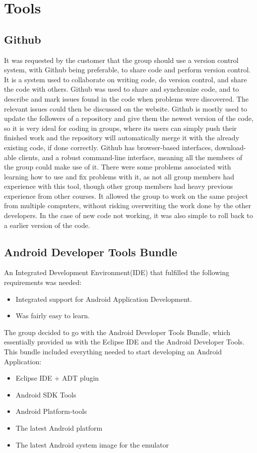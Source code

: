 \chapter{Tools}

\section{Github} 
\label{def:github}
\label{def:githubDev}
It was requested by the customer that the group should use a version control system, with Github being preferable, to share code and perform version control. It is a system used to collaborate on writing code, do version control, and share the code with others.  Github was used to share and synchronize code, and to describe and mark issues found in the code when problems were discovered. The relevant issues could then be discussed on the website.  Github is mostly used to update the followers of a repository and give them the newest version of the code, so it is  very ideal for coding in groups, where its users can simply push their finished work and the repository will automatically merge it with the already existing code, if done correctly.  Github has browser-based interfaces, download-able clients, and a robust command-line interface, meaning all the members of the group could make use of it. There were some problems associated with learning how to use and fix problems with it, as not all group members had experience with this tool, though other group members had heavy previous experience from other courses. It allowed the group to work on the same project from multiple computers, without risking overwriting the work done by the other developers. In the case of new code not working, it was also simple to roll back to a earlier version of the code. 

\section{Android Developer Tools Bundle}
An Integrated Development Environment(IDE) that fulfilled the following requirements was needed:
\begin{itemize}
\item Integrated support for Android Application Development.
\item Was fairly easy to learn. 
\end{itemize}
The group decided to go with the Android Developer Tools Bundle, which essentially provided us with the Eclipse IDE and the Android Developer Tools. This bundle included everything needed to start developing an Android Application:
\begin{itemize}
\item Eclipse IDE + ADT plugin
\item Android SDK Tools
\item Android Platform-tools
\item The latest Android platform
\item The latest Android system image for the emulator
\end{itemize}

